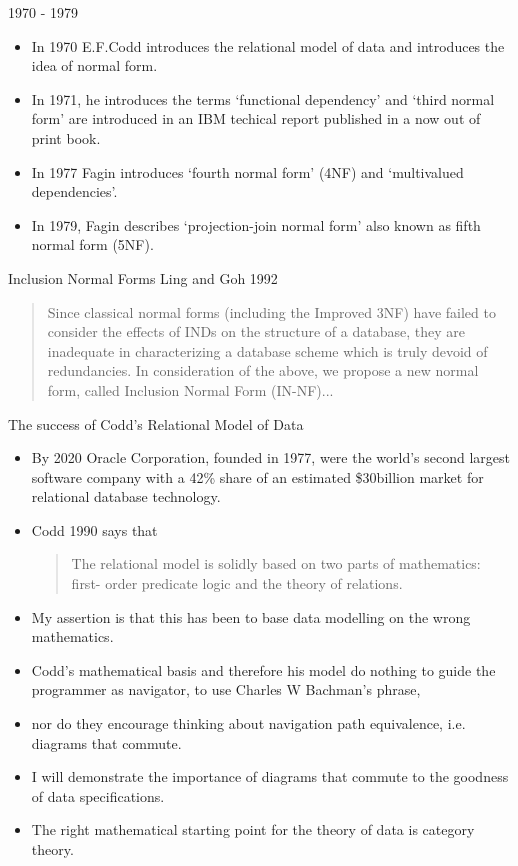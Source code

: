 
\begin{frame}{1970 - 1979}
\begin{itemize}
\item In 1970 E.F.Codd introduces the relational model of data and introduces the idea of normal form.
\item In 1971, he introduces the terms `functional dependency' and  `third normal form' are introduced in an IBM techical report published in a now out of print book.
\item In 1977 Fagin introduces `fourth normal form' (4NF) and `multivalued dependencies'.
\item In 1979, Fagin describes `projection-join normal form' also known as fifth normal form (5NF).
\end{itemize} 
\end{frame}

\begin{frame}{Inclusion Normal Forms}
Ling and Goh 1992 
\begin{quote}
Since
classical normal forms (including the Improved 3NF)
have failed to consider the effects of INDs on the structure
of a database, they are inadequate in characterizing a
database scheme which is truly devoid of redundancies.
In consideration of the above, we propose a new normal
form, called Inclusion Normal Form (IN-NF)...
\end{quote}
\end{frame}

\begin{frame}{The success of Codd's Relational Model of Data}
\begin{itemize}
\item By 2020 Oracle Corporation, founded in 1977, were the world's second largest software company with a 42\% share of an 
estimated \$30billion market for relational database technology. 
\item Codd 1990 says that
\begin{quote}
The relational model is solidly based on two parts of mathematics: first-
order predicate logic and the theory of relations.
\end{quote}
\item My assertion is that this has been to base data modelling on the wrong mathematics. 
\item Codd's mathematical basis and therefore his  model  do nothing to guide the programmer as navigator, to use Charles W Bachman's phrase, 
\item nor do they encourage thinking about navigation path equivalence, i.e. diagrams that commute.
\item I will demonstrate the importance of diagrams that commute to the goodness of data specifications.
\item The right mathematical starting point for the theory of data is category theory.
\end{itemize}
\end{frame}
 


